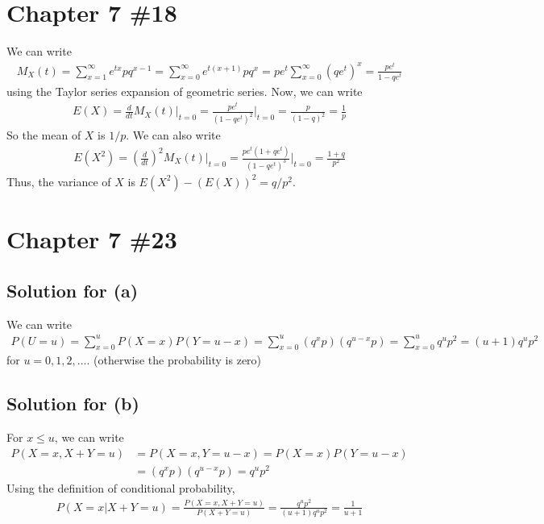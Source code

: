 \documentclass{scrartcl}
\begin{document}
\section{Chapter 7 \#18}
We can write
\begin{align*}
  M_X(t)
  = \sum^\infty_{x = 1} e^{tx} pq^{x - 1}
  = \sum^\infty_{x = 0} e^{t(x + 1)} pq^x
  = p e^t \sum^\infty_{x = 0} (qe^t)^x
  = \frac{p e^t}{1 - q e^t}
\end{align*}
using the Taylor series expansion of geometric series. Now, we can write
\begin{align*}
  E(X)
  = \frac{d}{dt} M_X(t) \Bigr|_{t = 0}
  = \frac{pe^t}{(1 - q e^t)^2} \Bigr|_{t = 0}
  = \frac{p}{(1 - q)^2}
  = \frac{1}{p}
\end{align*}
So the mean of \(X\) is \(1 / p\). We can also write
\begin{align*}
  E(X^2)
  = \left( \frac{d}{dt} \right)^2 M_X(t) \Bigr|_{t = 0}
  = \frac{p e^t (1 + q e^t)}{(1 - q e^t)^3} \Bigr|_{t = 0}
  = \frac{1 + q}{p^2}
\end{align*}
Thus, the variance of \(X\) is \(E(X^2) - (E(X))^2 = q / p^2\).

\section{Chapter 7 \#23}
\subsection{Solution for (a)}
We can write
\begin{align*}
  P(U = u)
  = \sum^u_{x = 0} P(X = x) P(Y = u - x)
  = \sum^u_{x = 0} (q^x p) (q^{u - x} p)
  = \sum^u_{x = 0} q^u p^2
  = (u + 1) q^u p^2
\end{align*}
for \(u = 0, 1, 2, \dots\). (otherwise the probability is zero)

\subsection{Solution for (b)}
For \(x \le u\), we can write
\begin{align*}
  P(X = x, X + Y = u)
  &= P(X = x, Y = u - x)
  = P(X = x) P(Y = u - x) \\
  &= (q^x p) (q^{u - x} p)
  = q^u p^2
\end{align*}
Using the definition of conditional probability,
\begin{align*}
  P(X = x | X + Y = u)
  = \frac{P(X = x, X + Y = u)}{P(X + Y = u)}
  = \frac{q^u p^2}{(u + 1) q^u p^2}
  = \frac{1}{u + 1}
\end{align*}
\end{document}
